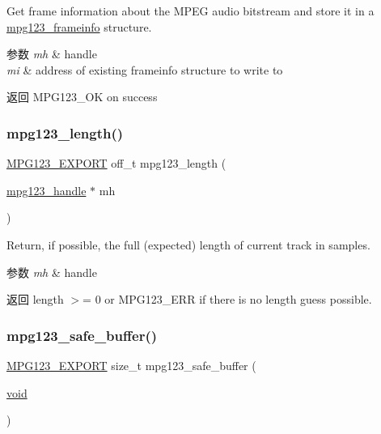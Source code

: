 Get frame information about the M\+P\+EG audio bitstream and store it in a \hyperlink{structmpg123__frameinfo}{mpg123\+\_\+frameinfo} structure. 
\begin{DoxyParams}{参数}
{\em mh} & handle \\
\hline
{\em mi} & address of existing frameinfo structure to write to \\
\hline
\end{DoxyParams}
\begin{DoxyReturn}{返回}
M\+P\+G123\+\_\+\+OK on success 
\end{DoxyReturn}
\mbox{\label{group__mpg123__status_ga7a97295f5dd82795489d9ed8ee544805}} 
\subsubsection{\texorpdfstring{mpg123\+\_\+length()}{mpg123\_length()}}
{\footnotesize\ttfamily \hyperlink{mpg123_8h_a2ba98cfba3f760879df70e755b2a61cc}{M\+P\+G123\+\_\+\+E\+X\+P\+O\+RT} off\+\_\+t mpg123\+\_\+length (\begin{DoxyParamCaption}\item[{\hyperlink{group__mpg123__init_ga6728e2839a395f3a07d4514da659faca}{mpg123\+\_\+handle} $\ast$}]{mh }\end{DoxyParamCaption})}

Return, if possible, the full (expected) length of current track in samples. 
\begin{DoxyParams}{参数}
{\em mh} & handle \\
\hline
\end{DoxyParams}
\begin{DoxyReturn}{返回}
length $>$= 0 or M\+P\+G123\+\_\+\+E\+RR if there is no length guess possible. 
\end{DoxyReturn}
\mbox{\label{group__mpg123__status_gafdb7e99795ac9915f47d0e1985ce3968}} 
\subsubsection{\texorpdfstring{mpg123\+\_\+safe\+\_\+buffer()}{mpg123\_safe\_buffer()}}
{\footnotesize\ttfamily \hyperlink{mpg123_8h_a2ba98cfba3f760879df70e755b2a61cc}{M\+P\+G123\+\_\+\+E\+X\+P\+O\+RT} size\+\_\+t mpg123\+\_\+safe\+\_\+buffer (\begin{DoxyParamCaption}\item[{\hyperlink{interfacevoid}{void}}]{ }\end{DoxyParamCaption})}

